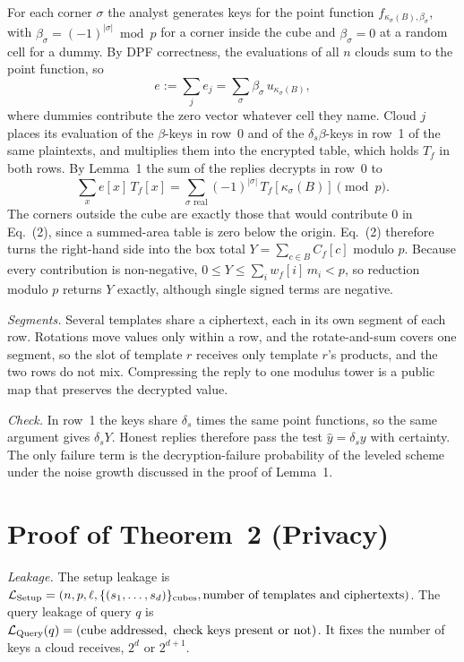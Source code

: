 \documentclass[10pt,journal,compsoc]{IEEEtran}
\begin{document}
\begin{IEEEproof}
For each corner $\sigma$ the analyst generates keys for the point function
$f_{\kappa_\sigma(B),\beta_\sigma}$, with $\beta_\sigma=(-1)^{|\sigma|}\bmod p$
for a corner inside the cube and $\beta_\sigma=0$ at a random cell for a dummy.
By DPF correctness, the evaluations of all $n$ clouds sum to the point
function, so
\[
e:=\sum_{j}e_j=\sum_{\sigma}\beta_\sigma\,u_{\kappa_\sigma(B)},
\]
where dummies contribute the zero vector whatever cell they name. Cloud $j$
places its evaluation of the $\beta$-keys in row~0 and of the
$\delta_s\beta$-keys in row~1 of the same plaintexts, and multiplies them into
the encrypted table, which holds $T_f$ in both rows. By Lemma~1 the sum of the
replies decrypts in row~0 to
\[
\sum_x e[x]\,T_f[x]=\sum_{\sigma\text{ real}}(-1)^{|\sigma|}\,T_f[\kappa_\sigma(B)]\pmod p .
\]
The corners outside the cube are exactly those that would contribute $0$ in
Eq.~(2), since a summed-area table is zero below the origin. Eq.~(2) therefore
turns the right-hand side into the box total $Y=\sum_{c\in B}C_f[c]$ modulo
$p$. Because every contribution is non-negative, $0\le Y\le\sum_iw_f[i]\,m_i<p$,
so reduction modulo $p$ returns $Y$ exactly, although single signed terms are
negative.

\emph{Segments.} Several templates share a ciphertext, each in its own segment
of each row. Rotations move values only within a row, and the rotate-and-sum
covers one segment, so the slot of template $r$ receives only template $r$'s
products, and the two rows do not mix. Compressing the reply to one modulus
tower is a public map that preserves the decrypted value.

\emph{Check.} In row~1 the keys share $\delta_s$ times the same point
functions, so the same argument gives $\delta_sY$. Honest replies therefore
pass the test $\hat y=\delta_sy$ with certainty. The only failure term is the
decryption-failure probability of the leveled scheme under the noise growth
discussed in the proof of Lemma~1.
\end{IEEEproof}

\section{Proof of Theorem~2 (Privacy)}

\emph{Leakage.} The setup leakage is
$\mathcal{L}_{\mathrm{Setup}}=(n,p,\ell,\{(s_1,\dots,s_d)\}_{\text{cubes}},
\text{number of templates and ciphertexts})$. The query leakage of query $q$ is
$\mathcal{L}_{\mathrm{Query}}(q)=(\text{cube addressed},\ \text{check keys present or
not})$. It fixes the number of keys a cloud receives, $2^d$ or $2^{d+1}$.
\end{document}
